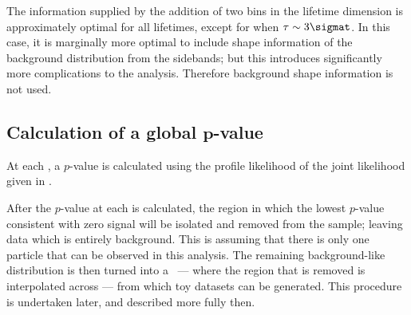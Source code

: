 The information supplied by the addition of two bins in the lifetime dimension is approximately
optimal for all \db lifetimes, except for when $\tau\sim3\sigmat$.
In this case, it is marginally more optimal to include shape information of the background
distribution from the sidebands; but this introduces
significantly more complications to the analysis.
Therefore background shape information is not used.


\subsection[Calculation of a global $p$-value]
{Calculation of a global $\boldsymbol{p}$-value}
\label{sec:db:pval}
At each , a $p$-value is calculated using the profile likelihood of the joint likelihood
given in .

After the $p$-value at each  is calculated, the region in which the lowest $p$-value
consistent with zero signal will be isolated and removed from the sample; leaving data
which is entirely background.
This is assuming that there is only one \np particle that can be observed in this analysis.
The remaining background-like distribution is then turned into a \PDF\ --- where the region that is
removed is interpolated across --- from which toy datasets can be generated.
This procedure is undertaken later, and described more fully then.

